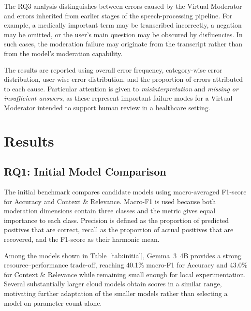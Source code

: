 \documentclass[11pt,a4paper]{article}
\begin{document}
The RQ3 analysis distinguishes between errors caused by the Virtual Moderator
and errors inherited from earlier stages of the speech-processing pipeline.
For example, a medically important term may be transcribed incorrectly, a
negation may be omitted, or the user's main question may be obscured by
disfluencies. In such cases, the moderation failure may originate from the
transcript rather than from the model's moderation capability.

The results are reported using overall error frequency, category-wise error
distribution, user-wise error distribution, and the proportion of errors
attributed to each cause. Particular attention is given to
\emph{misinterpretation} and \emph{missing or insufficient answers}, as these
represent important failure modes for a Virtual Moderator intended to support
human review in a healthcare setting.
\section{Results}
\label{sec:results}
\subsection{RQ1: Initial Model Comparison}
The initial benchmark compares candidate models using macro-averaged F1-score
for Accuracy and Context \& Relevance. Macro-F1 is used because both moderation
dimensions contain three classes and the metric gives equal importance to each
class. Precision is defined as the proportion of predicted positives that are
correct, recall as the proportion of actual positives that are recovered, and
the F1-score as their harmonic mean.

Among the models shown in Table~\ref{tab:initial}, Gemma~3~4B provides a strong
resource--performance trade-off, reaching 40.1\% macro-F1 for Accuracy and
43.0\% for Context \& Relevance while remaining small enough for local
experimentation. Several substantially larger cloud models obtain scores in a
similar range, motivating further adaptation of the smaller models rather than
selecting a model on parameter count alone.
\end{document}
